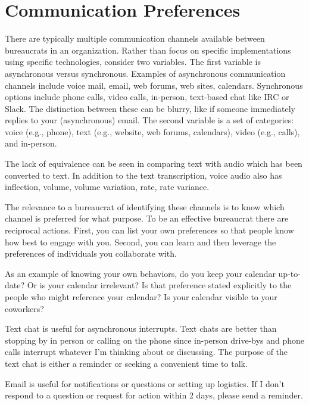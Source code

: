 \section{Communication Preferences}

There are typically multiple communication channels available between bureaucrats in an organization. Rather than focus on specific implementations using specific technologies, consider two variables. The first variable is asynchronous versus synchronous. Examples of asynchronous communication channels include voice mail, email, web forums, web sites, calendars. Synchronous options include phone calls, video calls, in-person, text-based chat like IRC or Slack. The distinction between these can be blurry, like if someone immediately replies to your (asynchronous) email.  The second variable is a set of categories: voice (e.g., phone), text (e.g., website, web forums, calendars), video (e.g., calls), and in-person. 

The lack of equivalence can be seen in comparing text with audio which has been converted to text. In addition to the text transcription, voice audio also has inflection, volume, volume variation, rate, rate variance.

The relevance to a bureaucrat of identifying these channels is to know which channel is preferred for what purpose. To be an effective bureaucrat there are reciprocal actions. First, you can list your own preferences so that people know how best to engage with you.
Second, you can learn and then leverage the preferences of individuals you collaborate with.

As an example of knowing your own behaviors, do you keep your calendar up-to-date? Or is your calendar irrelevant? Is that preference stated explicitly to the people who might reference your calendar? Is your calendar visible to your coworkers?

Text chat is useful for asynchronous interrupts. Text chats are better than stopping by in person or calling on the phone since in-person drive-bys and phone calls interrupt whatever I'm thinking about or discussing. The purpose of the text chat is either a reminder or seeking a convenient time to talk. 

Email is useful for notifications or questions or setting up logistics. If I don't respond to a question or request for action within 2 days, please send a reminder. 

